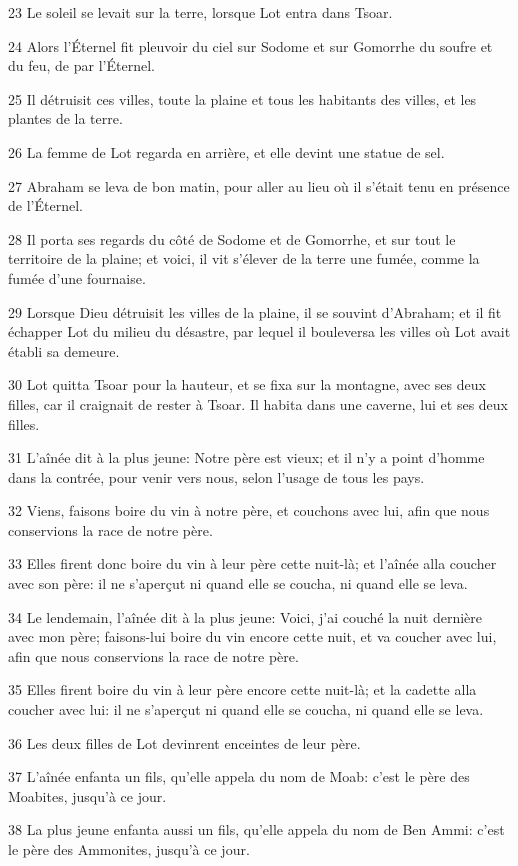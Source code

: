 \par 23 Le soleil se levait sur la terre, lorsque Lot entra dans Tsoar.
\par 24 Alors l'Éternel fit pleuvoir du ciel sur Sodome et sur Gomorrhe du soufre et du feu, de par l'Éternel.
\par 25 Il détruisit ces villes, toute la plaine et tous les habitants des villes, et les plantes de la terre.
\par 26 La femme de Lot regarda en arrière, et elle devint une statue de sel.
\par 27 Abraham se leva de bon matin, pour aller au lieu où il s'était tenu en présence de l'Éternel.
\par 28 Il porta ses regards du côté de Sodome et de Gomorrhe, et sur tout le territoire de la plaine; et voici, il vit s'élever de la terre une fumée, comme la fumée d'une fournaise.
\par 29 Lorsque Dieu détruisit les villes de la plaine, il se souvint d'Abraham; et il fit échapper Lot du milieu du désastre, par lequel il bouleversa les villes où Lot avait établi sa demeure.
\par 30 Lot quitta Tsoar pour la hauteur, et se fixa sur la montagne, avec ses deux filles, car il craignait de rester à Tsoar. Il habita dans une caverne, lui et ses deux filles.
\par 31 L'aînée dit à la plus jeune: Notre père est vieux; et il n'y a point d'homme dans la contrée, pour venir vers nous, selon l'usage de tous les pays.
\par 32 Viens, faisons boire du vin à notre père, et couchons avec lui, afin que nous conservions la race de notre père.
\par 33 Elles firent donc boire du vin à leur père cette nuit-là; et l'aînée alla coucher avec son père: il ne s'aperçut ni quand elle se coucha, ni quand elle se leva.
\par 34 Le lendemain, l'aînée dit à la plus jeune: Voici, j'ai couché la nuit dernière avec mon père; faisons-lui boire du vin encore cette nuit, et va coucher avec lui, afin que nous conservions la race de notre père.
\par 35 Elles firent boire du vin à leur père encore cette nuit-là; et la cadette alla coucher avec lui: il ne s'aperçut ni quand elle se coucha, ni quand elle se leva.
\par 36 Les deux filles de Lot devinrent enceintes de leur père.
\par 37 L'aînée enfanta un fils, qu'elle appela du nom de Moab: c'est le père des Moabites, jusqu'à ce jour.
\par 38 La plus jeune enfanta aussi un fils, qu'elle appela du nom de Ben Ammi: c'est le père des Ammonites, jusqu'à ce jour.

